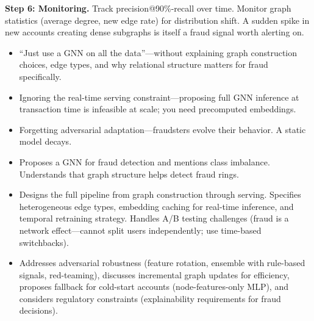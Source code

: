 \begin{interviewq}
\textbf{Step 6: Monitoring.} Track precision@90\%-recall over time. Monitor graph statistics (average degree, new edge rate) for distribution shift. A sudden spike in new accounts creating dense subgraphs is itself a fraud signal worth alerting on.

\redflags
\begin{itemize}
    \item ``Just use a GNN on all the data''---without explaining graph construction choices, edge types, and why relational structure matters for fraud specifically.
    \item Ignoring the real-time serving constraint---proposing full GNN inference at transaction time is infeasible at scale; you need precomputed embeddings.
    \item Forgetting adversarial adaptation---fraudsters evolve their behavior. A static model decays.
\end{itemize}


\goodgreat
\begin{itemize}
    \item {} Proposes a GNN for fraud detection and mentions class imbalance. Understands that graph structure helps detect fraud rings.
    \item {} Designs the full pipeline from graph construction through serving. Specifies heterogeneous edge types, embedding caching for real-time inference, and temporal retraining strategy. Handles A/B testing challenges (fraud is a network effect---cannot split users independently; use time-based switchbacks).
    \item {} Addresses adversarial robustness (feature rotation, ensemble with rule-based signals, red-teaming), discusses incremental graph updates for efficiency, proposes fallback for cold-start accounts (node-features-only MLP), and considers regulatory constraints (explainability requirements for fraud decisions).
\end{itemize}

\end{interviewq}

